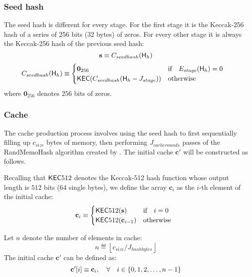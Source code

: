 \subsubsection{Seed hash}
The seed hash is different for every stage. For the first stage it is the Keccak-256 hash of a series of 256 bits (32 bytes) of zeros. For every other stage it is always the Keccak-256 hash of the previous seed hash:
\begin{equation}
 \mathbf{s} \equiv C_{seedhash}(\textsf{H}_{h})
\end{equation}
\begin{equation}
 C_{seedhash}(\textsf{H}_{h}) \equiv \begin{cases}
\mathbf{0}_{256} & \text{if} \quad E_{stage}(\textsf{H}_{h}) = 0 \quad  \\
\mathsf{KEC}(C_{seedhash}(\textsf{H}_{h} - J_{stage})) & \text{otherwise}
\end{cases}
\end{equation}
where $\mathbf{0}_{256}$ denotes $256$ bits of zeros.

\subsubsection{Cache}
The cache production process involves using the seed hash to first sequentially filling up $c_{size}$ bytes of memory, then performing $J_{cacherounds}$ passes of the RandMemoHash algorithm created by \cite{lerner2014randmemohash}. The initial cache $\mathbf{c'}$ will be constructed as follows.

Recalling that $\mathsf{KEC}512$ denotes the Keccak-512 hash function whose output length is $512$ bits ($64$ single bytes), 
we define the array $\mathbf{c}_{i}$ as the $i$-th element of the initial cache:
\begin{equation}
	\mathbf{c}_{i} \equiv 
	\begin{cases}
		\mathsf{KEC}512(\mathbf{s}) & \text{if} \quad i = 0 \quad  \\
		\mathsf{KEC}512(\mathbf{c}_{i-1}) & \text{otherwise}
	\end{cases}
\end{equation}

Let $n$ denote the number of elements in cache:
\begin{equation}
	n \eqdef \left\lfloor c_{size}/J_{hashbytes}\right\rfloor
\end{equation}
The initial cache $\mathbf{c'}$ can be defined as:
\begin{equation}
 \mathbf{c'}[i] \equiv \mathbf{c}_{i}, \quad \forall \quad i \in{\left \{{0,1,2,\dots, n-1} \right \}}
\end{equation}


